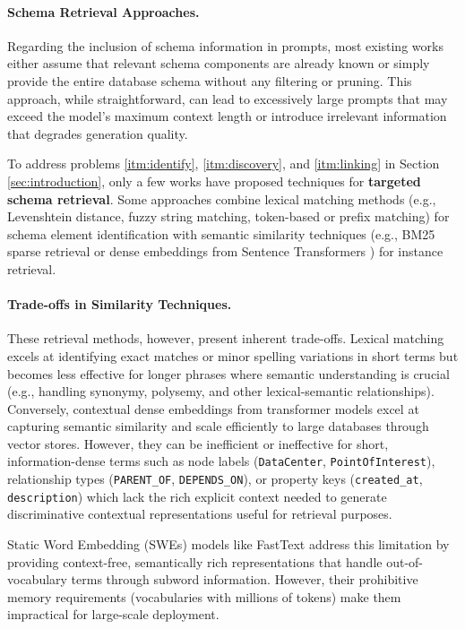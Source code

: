 \paragraph{Schema Retrieval Approaches.}
Regarding the inclusion of schema information in prompts, most existing works \cite{neo4jlabs-text2cypher-2024, cypherbench-megagonlabs-2024, longwell-etal-2024-triple-augmented, dabramo-etal-2025-investigating} either assume that relevant schema components are already known or simply provide the entire database schema without any filtering or pruning. This approach, while straightforward, can lead to excessively large prompts that may exceed the model's maximum context length or introduce irrelevant information that degrades generation quality.

To address problems \ref{itm:identify}, \ref{itm:discovery}, and \ref{itm:linking} in Section \ref{sec:introduction}, only a few works have proposed techniques for \textbf{targeted schema retrieval}. Some approaches \cite{yang-etal-2026-enhancing, grasp-walter-bast-2025, grasp-entity-linking-2025} combine lexical matching methods (e.g., Levenshtein distance, fuzzy string matching, token-based or prefix matching) for schema element identification with semantic similarity techniques (e.g., BM25 sparse retrieval or dense embeddings from Sentence Transformers \cite{reimers-2019-sentence-bert}) for instance retrieval.

\paragraph{Trade-offs in Similarity Techniques.}
These retrieval methods, however, present inherent trade-offs. Lexical matching excels at identifying exact matches or minor spelling variations in short terms but becomes less effective for longer phrases where semantic understanding is crucial (e.g., handling synonymy, polysemy, and other lexical-semantic relationships). Conversely, contextual dense embeddings from transformer models excel at capturing semantic similarity and scale efficiently to large databases through vector stores. However, they can be inefficient or ineffective for short, information-dense terms such as node labels (\verb|DataCenter|, \verb|PointOfInterest|), relationship types (\verb|PARENT_OF|, \verb|DEPENDS_ON|), or property keys (\verb|created_at|, \verb|description|) which lack the rich explicit context needed to generate discriminative contextual representations useful for retrieval purposes.

Static Word Embedding (SWEs) models like FastText \cite{bojanowski-etal-2017-enriching} address this limitation by providing context-free, semantically rich representations that handle out-of-vocabulary terms through subword information. However, their prohibitive memory requirements (vocabularies with millions of tokens) make them impractical for large-scale deployment.

